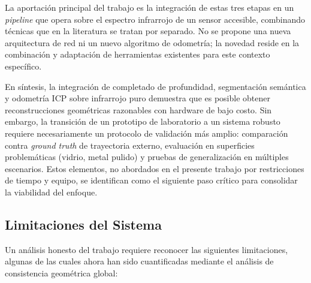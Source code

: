 \documentclass[12pt, a4, twoside, openany]{report}
\begin{document}
La aportación principal del trabajo es la integración de estas tres etapas en un \textit{pipeline} que opera sobre el espectro infrarrojo de un sensor accesible, combinando técnicas que en la literatura se tratan por separado. No se propone una nueva arquitectura de red ni un nuevo algoritmo de odometría; la novedad reside en la combinación y adaptación de herramientas existentes para este contexto específico.

En síntesis, la integración de completado de profundidad, segmentación semántica y odometría ICP sobre infrarrojo puro demuestra que es posible obtener reconstrucciones geométricas razonables con hardware de bajo costo. Sin embargo, la transición de un prototipo de laboratorio a un sistema robusto requiere necesariamente un protocolo de validación más amplio: comparación contra \textit{ground truth} de trayectoria externo, evaluación en superficies problemáticas (vidrio, metal pulido) y pruebas de generalización en múltiples escenarios. Estos elementos, no abordados en el presente trabajo por restricciones de tiempo y equipo, se identifican como el siguiente paso crítico para consolidar la viabilidad del enfoque.

\subsection{Limitaciones del Sistema}

Un análisis honesto del trabajo requiere reconocer las siguientes limitaciones, algunas de las cuales ahora han sido cuantificadas mediante el análisis de consistencia geométrica global:
\end{document}
